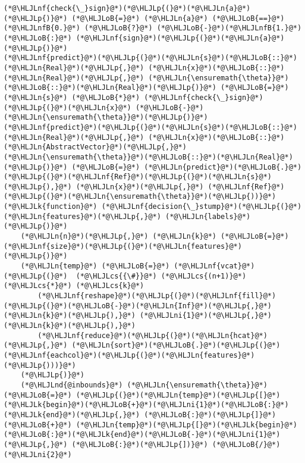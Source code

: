 \documentclass[12pt,a4paper]{article}
\newcommand{\HLJLk}[1]{\textcolor[RGB]{148,91,176}{\textbf{#1}}}
\newcommand{\HLJLn}[1]{#1}
\newcommand{\HLJLnd}[1]{\textcolor[RGB]{214,102,97}{#1}}
\newcommand{\HLJLnf}[1]{\textcolor[RGB]{66,102,213}{#1}}
\newcommand{\HLJLnfB}[1]{\textcolor[RGB]{59,151,46}{#1}}
\newcommand{\HLJLni}[1]{\textcolor[RGB]{59,151,46}{#1}}
\newcommand{\HLJLoB}[1]{\textcolor[RGB]{102,102,102}{\textbf{#1}}}
\newcommand{\HLJLp}[1]{#1}
\newcommand{\HLJLcs}[1]{\textcolor[RGB]{153,153,119}{\textit{#1}}}
\begin{document}
\begin{lstlisting}
(*@\HLJLnf{check{\_}sign}@*)(*@\HLJLp{(}@*)(*@\HLJLn{a}@*)(*@\HLJLp{)}@*) (*@\HLJLoB{=}@*) (*@\HLJLn{a}@*) (*@\HLJLoB{==}@*) (*@\HLJLnfB{0.}@*) (*@\HLJLoB{?}@*) (*@\HLJLoB{-}@*)(*@\HLJLnfB{1.}@*) (*@\HLJLoB{:}@*) (*@\HLJLnf{sign}@*)(*@\HLJLp{(}@*)(*@\HLJLn{a}@*)(*@\HLJLp{)}@*)
(*@\HLJLnf{predict}@*)(*@\HLJLp{(}@*)(*@\HLJLn{s}@*)(*@\HLJLoB{::}@*)(*@\HLJLn{Real}@*)(*@\HLJLp{,}@*) (*@\HLJLn{x}@*)(*@\HLJLoB{::}@*)(*@\HLJLn{Real}@*)(*@\HLJLp{,}@*) (*@\HLJLn{\ensuremath{\theta}}@*)(*@\HLJLoB{::}@*)(*@\HLJLn{Real}@*)(*@\HLJLp{)}@*) (*@\HLJLoB{=}@*) (*@\HLJLn{s}@*) (*@\HLJLoB{*}@*) (*@\HLJLnf{check{\_}sign}@*)(*@\HLJLp{(}@*)(*@\HLJLn{x}@*) (*@\HLJLoB{-}@*) (*@\HLJLn{\ensuremath{\theta}}@*)(*@\HLJLp{)}@*)
(*@\HLJLnf{predict}@*)(*@\HLJLp{(}@*)(*@\HLJLn{s}@*)(*@\HLJLoB{::}@*)(*@\HLJLn{Real}@*)(*@\HLJLp{,}@*) (*@\HLJLn{x}@*)(*@\HLJLoB{::}@*)(*@\HLJLn{AbstractVector}@*)(*@\HLJLp{,}@*) (*@\HLJLn{\ensuremath{\theta}}@*)(*@\HLJLoB{::}@*)(*@\HLJLn{Real}@*)(*@\HLJLp{)}@*) (*@\HLJLoB{=}@*) (*@\HLJLn{predict}@*)(*@\HLJLoB{.}@*)(*@\HLJLp{(}@*)(*@\HLJLnf{Ref}@*)(*@\HLJLp{(}@*)(*@\HLJLn{s}@*)(*@\HLJLp{),}@*) (*@\HLJLn{x}@*)(*@\HLJLp{,}@*) (*@\HLJLnf{Ref}@*)(*@\HLJLp{(}@*)(*@\HLJLn{\ensuremath{\theta}}@*)(*@\HLJLp{))}@*)
(*@\HLJLk{function}@*) (*@\HLJLnf{decision{\_}stump}@*)(*@\HLJLp{(}@*)(*@\HLJLn{features}@*)(*@\HLJLp{,}@*) (*@\HLJLn{labels}@*)(*@\HLJLp{)}@*)
    (*@\HLJLn{n}@*)(*@\HLJLp{,}@*) (*@\HLJLn{k}@*) (*@\HLJLoB{=}@*) (*@\HLJLnf{size}@*)(*@\HLJLp{(}@*)(*@\HLJLn{features}@*)(*@\HLJLp{)}@*)
    (*@\HLJLn{temp}@*) (*@\HLJLoB{=}@*) (*@\HLJLnf{vcat}@*)(*@\HLJLp{(}@*)  (*@\HLJLcs{{\#}}@*) (*@\HLJLcs{(n+1)}@*) (*@\HLJLcs{*}@*) (*@\HLJLcs{k}@*)
        (*@\HLJLnf{reshape}@*)(*@\HLJLp{(}@*)(*@\HLJLnf{fill}@*)(*@\HLJLp{(}@*)(*@\HLJLoB{-}@*)(*@\HLJLn{Inf}@*)(*@\HLJLp{,}@*) (*@\HLJLn{k}@*)(*@\HLJLp{),}@*) (*@\HLJLni{1}@*)(*@\HLJLp{,}@*) (*@\HLJLn{k}@*)(*@\HLJLp{),}@*)
        (*@\HLJLnf{reduce}@*)(*@\HLJLp{(}@*)(*@\HLJLn{hcat}@*)(*@\HLJLp{,}@*) (*@\HLJLn{sort}@*)(*@\HLJLoB{.}@*)(*@\HLJLp{(}@*)(*@\HLJLnf{eachcol}@*)(*@\HLJLp{(}@*)(*@\HLJLn{features}@*)(*@\HLJLp{)))}@*)
    (*@\HLJLp{)}@*)
    (*@\HLJLnd{@inbounds}@*) (*@\HLJLn{\ensuremath{\theta}}@*) (*@\HLJLoB{=}@*) (*@\HLJLp{(}@*)(*@\HLJLn{temp}@*)(*@\HLJLp{[}@*)(*@\HLJLk{begin}@*)(*@\HLJLoB{+}@*)(*@\HLJLni{1}@*)(*@\HLJLoB{:}@*)(*@\HLJLk{end}@*)(*@\HLJLp{,}@*) (*@\HLJLoB{:}@*)(*@\HLJLp{]}@*) (*@\HLJLoB{+}@*) (*@\HLJLn{temp}@*)(*@\HLJLp{[}@*)(*@\HLJLk{begin}@*)(*@\HLJLoB{:}@*)(*@\HLJLk{end}@*)(*@\HLJLoB{-}@*)(*@\HLJLni{1}@*)(*@\HLJLp{,}@*) (*@\HLJLoB{:}@*)(*@\HLJLp{])}@*) (*@\HLJLoB{/}@*) (*@\HLJLni{2}@*)


\end{lstlisting}
\end{document}
